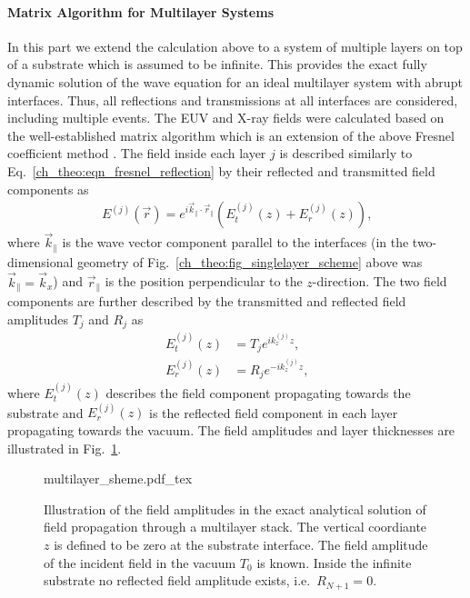 \paragraph{Matrix Algorithm for Multilayer Systems}
In this part we extend the calculation above to a system of multiple layers on top of a substrate which is assumed to be infinite. This provides the exact fully dynamic solution of the wave equation for an ideal multilayer system with abrupt interfaces. Thus, all reflections and transmissions at all interfaces are considered, including multiple events. The EUV and X-ray fields were calculated based on the well-established matrix algorithm which is an extension of the above Fresnel coefficient method \cite{born_principles_1965,mikulik_x-ray_1997}. The field inside each layer $j$ is described similarly to Eq.~\eqref{ch_theo:eqn_fresnel_reflection} by their reflected and transmitted field components as
\begin{align}
E^{(j)}(\vec{r}) = e^{i \vec{k}_\parallel \cdot \vec{r}_\parallel} (E_t^{(j)}(z) + E_r^{(j)}(z)) \text{,}
\end{align}
where $\vec{k}_\parallel$ is the wave vector component parallel to the interfaces (in the two-dimensional geometry of Fig.~\ref{ch_theo:fig_singlelayer_scheme} above was $\vec{k}_\parallel = \vec{k}_x$) and $\vec{r}_\parallel$ is the position perpendicular to the $z$-direction. The two field components are further described by the transmitted and reflected field amplitudes $T_j$ and $R_j$ as
\begin{align}
E_t^{(j)}(z) &= T_{j} e^{i k_z^{(j)} z} \text{,} \\
E_r^{(j)}(z) &= R_{j} e^{-i k_z^{(j)} z} \text{,} 
\end{align}
where $E_t^{(j)}(z)$ describes the field component propagating towards the substrate and $E_r^{(j)}(z)$ is the reflected field component in each layer propagating towards the vacuum. The field amplitudes and layer thicknesses are illustrated in Fig.~\ref{ch_theo:fig_multilayer_scheme}.
\begin{figure}[htb]
    {multilayer_sheme.pdf_tex}
    \caption{Illustration of the field amplitudes in the exact analytical solution of field propagation through a multilayer stack. The vertical coordiante $z$ is defined to be zero at the substrate interface. The field amplitude of the incident field in the vacuum $T_0$ is known. Inside the infinite substrate no reflected field amplitude exists, i.e.~$R_{N+1} = 0$.}
    \label{ch_theo:fig_multilayer_scheme}
\end{figure}
